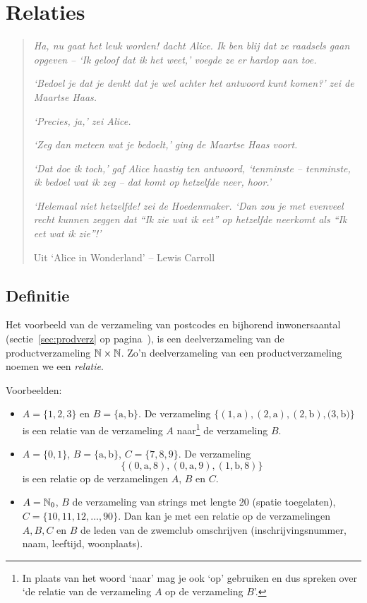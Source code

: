 %
 
 
\chapter{Relaties}
\label{chap:relatie}
\begin{quote}
\textit{Ha, nu gaat het leuk worden! dacht Alice. Ik ben blij dat ze raadsels gaan opgeven -- `Ik geloof dat ik het weet,' voegde ze er hardop aan toe.}

\textit{`Bedoel je dat je denkt dat je wel achter het antwoord kunt komen?' zei de Maartse Haas.}

\textit{`Precies, ja,' zei Alice.}

\textit{`Zeg dan meteen wat je bedoelt,' ging de Maartse Haas voort.}

\textit{`Dat doe ik toch,' gaf Alice haastig ten antwoord, `tenminste -- tenminste, ik bedoel wat ik zeg -- dat komt op hetzelfde neer, hoor.'}

\textit{`Helemaal niet hetzelfde! zei de Hoedenmaker. `Dan zou je met evenveel recht kunnen zeggen dat ``Ik zie wat ik eet'' op hetzelfde neerkomt als ``Ik eet wat ik zie''!'}

          Uit `Alice in Wonderland' -- Lewis Carroll
\end{quote}



\newpage
 \section{Definitie}
 \label{sec:defRelatie}
Het voorbeeld van de verzameling van postcodes en bijhorend inwonersaantal (sectie~\ref{sec:prodverz} op pagina~\pageref{pg:postcodes}), is een deelverzameling van de productverzameling  $\mathbb{N}\times\mathbb{N}$. Zo'n deelverzameling van een productverzameling noemen we een \emph{relatie}.

Voorbeelden:
\begin{itemize}
  \item $A=\{1,2,3\}$ en $B=\{\text{a}, \text{b}\}$. De verzameling $\{(1, \text{a}), (2,\text{a}),(2,\text{b}),(3,\text{b)}\}$
        is een relatie van de verzameling $A$ naar\footnote{In plaats van het woord `naar' mag je ook `op' gebruiken en dus spreken over `de relatie van de verzameling $A$ op de verzameling $B$'.} de verzameling $B$.
  \item $A=\{0,1\}$, $B=\{\mathrm{a},\mathrm{b}\}$, $C=\{7,8,9\}$. De verzameling
        \[ \{(0,\mathrm{a},8), (0,\mathrm{a},9), (1,\mathrm{b},8) \} \]
        is een relatie op de verzamelingen $A$, $B$ en $C$.
  \item $A=\mathbb{N}_0$, $B$ de verzameling van strings met lengte 20 (spatie toegelaten),
       $C=\{10,11,12,\dots,90\}$. Dan kan je met een relatie op de verzamelingen $A, B, C$ en $B$ de leden van de zwemclub omschrijven (inschrijvingsnummer, naam, leeftijd, woonplaats).
\end{itemize}

